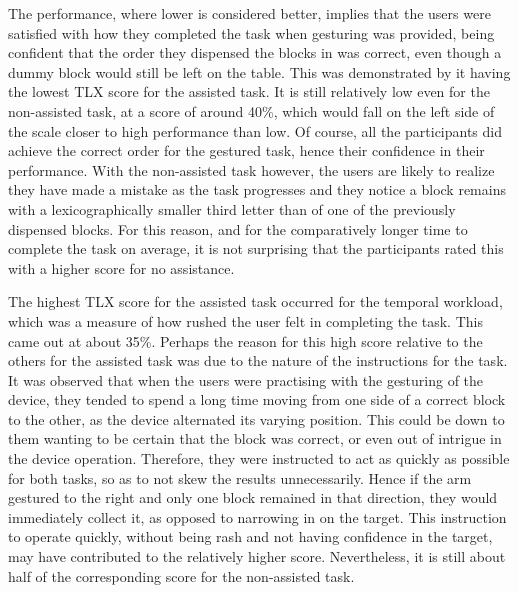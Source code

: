 \documentclass[11pt]{article}
\begin{document}
The performance, where lower is considered better, implies that the users were satisfied with how they completed the task when gesturing was provided, being confident that the order they dispensed the blocks in was correct, even though a dummy block would still be left on the table. This was demonstrated by it having the lowest TLX score for the assisted task. It is still relatively low even for the non-assisted task, at a score of around 40\%, which would fall on the left side of the scale closer to high performance than low. Of course, all the participants did achieve the correct order for the gestured task, hence their confidence in their performance. With the non-assisted task however, the users are likely to realize they have made a mistake as the task progresses and they notice a block remains with a lexicographically smaller third letter than of one of the previously dispensed blocks. For this reason, and for the comparatively longer time to complete the task on average, it is not surprising that the participants rated this with a higher score for no assistance. 

The highest TLX score for the assisted task occurred for the temporal workload, which was a measure of how rushed the user felt in completing the task. This came out at about 35\%. Perhaps the reason for this high score relative to the others for the assisted task was due to the nature of the instructions for the task. It was observed that when the users were practising with the gesturing of the device, they tended to spend a long time moving from one side of a correct block to the other, as the device alternated its varying position. This could be down to them wanting to be certain that the block was correct, or even out of intrigue in the device operation. Therefore, they were instructed to act as quickly as possible for both tasks, so as to not skew the results unnecessarily. Hence if the arm gestured to the right and only one block remained in that direction, they would immediately collect it, as opposed to narrowing in on the target. This instruction to operate quickly, without being rash and not having confidence in the target, may have contributed to the relatively higher score. Nevertheless, it is still about half of the corresponding score for the non-assisted task.
\end{document}
